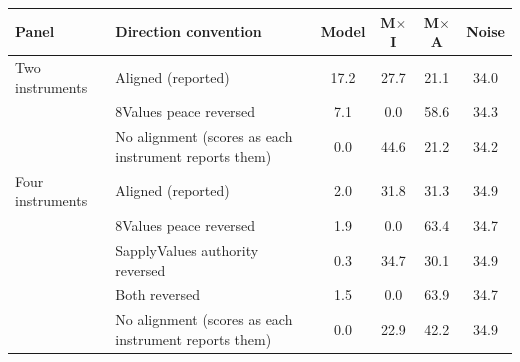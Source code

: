 \begin{tabular}{llcccc}
\toprule
Panel & Direction convention & Model & M$\times$I & M$\times$A & Noise \\
\midrule
Two instruments & Aligned (reported) & 17.2 & 27.7 & 21.1 & 34.0 \\
 & 8Values peace reversed & 7.1 & 0.0 & 58.6 & 34.3 \\
 & No alignment (scores as each instrument reports them) & 0.0 & 44.6 & 21.2 & 34.2 \\
\addlinespace
Four instruments & Aligned (reported) & 2.0 & 31.8 & 31.3 & 34.9 \\
 & 8Values peace reversed & 1.9 & 0.0 & 63.4 & 34.7 \\
 & SapplyValues authority reversed & 0.3 & 34.7 & 30.1 & 34.9 \\
 & Both reversed & 1.5 & 0.0 & 63.9 & 34.7 \\
 & No alignment (scores as each instrument reports them) & 0.0 & 22.9 & 42.2 & 34.9 \\
\bottomrule
\end{tabular}
